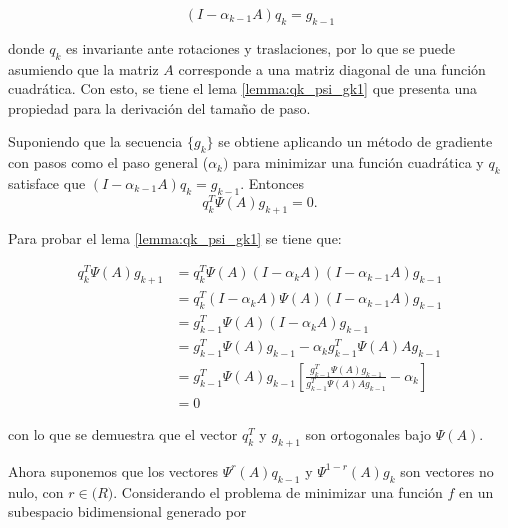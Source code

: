 \begin{equation}
    (I-\alpha_{k-1}A)q_k = g_{k-1}
    \label{eq:qdef}
\end{equation}

donde $q_k$ es invariante ante rotaciones y traslaciones, por lo que se puede asumiendo que la matriz $A$ corresponde a una matriz diagonal de una función cuadrática. Con esto, se tiene el lema \ref{lemma:qk_psi_gk1} que presenta una propiedad para la derivación del tamaño de paso.

\begin{lema}
    Suponiendo que la secuencia $\{g_k\}$ se obtiene aplicando un método de gradiente con pasos como el paso general ($\alpha_k)$ para minimizar una función cuadrática y $q_k$ satisface que $(I-\alpha_{k-1}A)q_k = g_{k-1}$. Entonces
    \begin{equation*}
        q_k^T\Psi(A)g_{k+1} = 0.
    \end{equation*}
    \label{lemma:qk_psi_gk1}
\end{lema}

Para probar el lema \ref{lemma:qk_psi_gk1} se tiene que:

\begin{align*}
    q_k^T \Psi(A)g_{k+1} & = q_k^T\Psi(A)(I-\alpha_kA)(I-\alpha_{k-1}A)g_{k-1}                                                    \\
                         & = q_k^T(I-\alpha_kA)\Psi(A)(I-\alpha_{k-1}A)g_{k-1}                                                    \\
                         & = g_{k-1}^T\Psi(A)(I-\alpha_kA)g_{k-1}                                                                 \\
                         & =g_{k-1}^T\Psi(A)g_{k-1}-\alpha_kg_{k-1}^T\Psi(A)Ag_{k-1}                                              \\
                         & =g_{k-1}^T\Psi(A)g_{k-1}\left[\frac{g_{k-1}^T\Psi(A)g_{k-1}}{g_{k-1}^T\Psi(A)Ag_{k-1}}-\alpha_k\right] \\
                         & = 0
\end{align*}

con lo que se demuestra que el vector $q_k^T$ y $g_{k+1}$ son ortogonales bajo $\Psi(A)$.

Ahora suponemos que los vectores $\Psi^r(A)q_{k-1}$ y $\Psi^{1-r}(A)g_k$ son vectores no nulo, con $r\in\mathbb(R)$. Considerando el problema de minimizar una función $f$ en un subespacio bidimensional generado por

